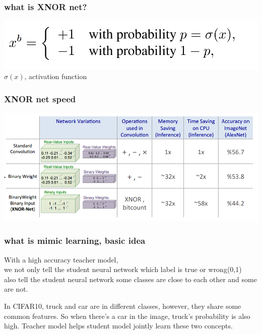 \documentclass{beamer}
\begin{document}
\begin{frame}
\frametitle{what is XNOR net?}
\includegraphics[width=\textwidth]{binary.png}\\
$\sigma(x)$, activation function
\end{frame}

\begin{frame}
\frametitle{XNOR net speed}
\includegraphics[width=\textwidth]{xnornet.png}\\
\end{frame}



\begin{frame}
\frametitle{what is mimic learning, basic idea}
With a high accuracy teacher model,\\
we not only tell the student neural network which label is true or wrong(0,1)\\
also tell the student neural network some classes are close to each other and some are not.\\
\begin{example}
In CIFAR10, truck and car are in different classes, however, they share some common features. So when there's a car in the image, truck's probability is also high. Teacher model helps student model jointly learn these two concepts.
\end{example}
\end{frame}
\end{document}
